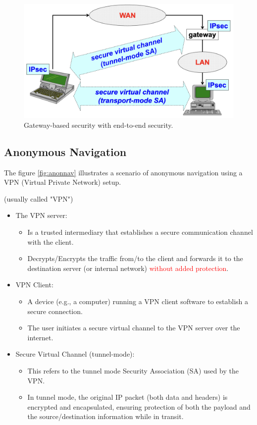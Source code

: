 \begin{figure}[H]
  \includegraphics[width=\linewidth]{Images/NetSec/gatsec_end.png}
  \caption{Gateway-based security with end-to-end security.}
  \label{fig:gat_end}
\end{figure}

\subsection{Anonymous Navigation}
The figure \ref{fig:anonnav} illustrates a scenario of anonymous navigation using a VPN (Virtual Private Network) setup.
\begin{center}
    (usually called "VPN")
\end{center}


\begin{itemize}
    \item The VPN server:
    \begin{itemize}
        \item Is a trusted intermediary that establishes a secure communication channel with the client. 
        \item Decrypts/Encrypts the traffic from/to the client and forwards it to the destination server (or internal network) \textcolor{red}{without added protection}. 
    \end{itemize}
    \item VPN Client:
    \begin{itemize}
        \item A device (e.g., a computer) running a VPN client software to establish a secure connection.
        \item The user initiates a secure virtual channel to the VPN server over the internet.
    \end{itemize}
    \item Secure Virtual Channel (tunnel-mode):
    \begin{itemize}
        \item This refers to the tunnel mode Security Association (SA) used by the VPN.
        \item In tunnel mode, the original IP packet (both data and headers) is encrypted and encapsulated, ensuring protection of both the payload and the source/destination information while in transit.
    \end{itemize}
\end{itemize}

